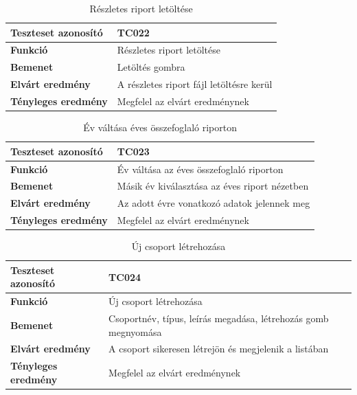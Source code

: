 \begin{table}[h!]
	\centering
	\begin{tabular}{|l|p{10cm}|}
		\hline
		\textbf{Teszteset azonosító} & TC022 \\ \hline
		\textbf{Funkció} & Részletes riport letöltése \\ \hline
		\textbf{Bemenet} & Letöltés gombra \\ \hline
		\textbf{Elvárt eredmény} & A részletes riport fájl letöltésre kerül \\ \hline
		\textbf{Tényleges eredmény} & Megfelel az elvárt eredménynek \\ \hline
	\end{tabular}
	\caption{Részletes riport letöltése}
	\label{tab:reszletes_riport_letoltes}
\end{table}

\begin{table}[h!]
	\centering
	\begin{tabular}{|l|p{10cm}|}
		\hline
		\textbf{Teszteset azonosító} & TC023 \\ \hline
		\textbf{Funkció} & Év váltása az éves összefoglaló riporton \\ \hline
		\textbf{Bemenet} & Másik év kiválasztása az éves riport nézetben \\ \hline
		\textbf{Elvárt eredmény} & Az adott évre vonatkozó adatok jelennek meg \\ \hline
		\textbf{Tényleges eredmény} & Megfelel az elvárt eredménynek \\ \hline
	\end{tabular}
	\caption{Év váltása éves összefoglaló riporton}
	\label{tab:ev_valtasa_osszegzo_riport}
\end{table}

\begin{table}[h!]
	\centering
	\begin{tabular}{|l|p{10cm}|}
		\hline
		\textbf{Teszteset azonosító} & TC024 \\ \hline
		\textbf{Funkció} & Új csoport létrehozása \\ \hline
		\textbf{Bemenet} & Csoportnév, típus, leírás megadása, létrehozás gomb megnyomása \\ \hline
		\textbf{Elvárt eredmény} & A csoport sikeresen létrejön és megjelenik a listában \\ \hline
		\textbf{Tényleges eredmény} & Megfelel az elvárt eredménynek \\ \hline
	\end{tabular}
	\caption{Új csoport létrehozása}
	\label{tab:csoport_letrehozas}
\end{table}

